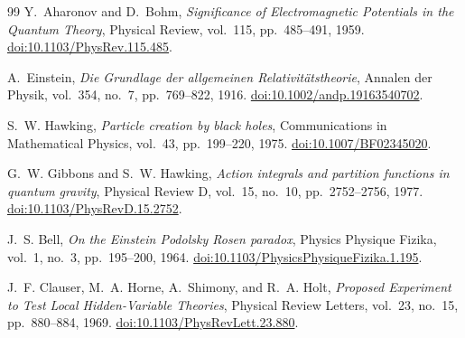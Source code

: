 \begin{thebibliography}{99}
Y.~Aharonov and D.~Bohm,
\emph{Significance of Electromagnetic Potentials in the Quantum Theory},
Physical Review, vol.~115, pp.~485--491, 1959.
\href{https://doi.org/10.1103/PhysRev.115.485}{doi:10.1103/PhysRev.115.485}.

A.~Einstein,
\emph{Die Grundlage der allgemeinen Relativit\"atstheorie},
Annalen der Physik, vol.~354, no.~7, pp.~769--822, 1916.
\href{https://doi.org/10.1002/andp.19163540702}{doi:10.1002/andp.19163540702}.

S.~W. Hawking,
\emph{Particle creation by black holes},
Communications in Mathematical Physics, vol.~43, pp.~199--220, 1975.
\href{https://doi.org/10.1007/BF02345020}{doi:10.1007/BF02345020}.

G.~W. Gibbons and S.~W. Hawking,
\emph{Action integrals and partition functions in quantum gravity},
Physical Review D, vol.~15, no.~10, pp.~2752--2756, 1977.
\href{https://doi.org/10.1103/PhysRevD.15.2752}{doi:10.1103/PhysRevD.15.2752}.

J.~S. Bell,
\emph{On the Einstein Podolsky Rosen paradox},
Physics Physique Fizika, vol.~1, no.~3, pp.~195--200, 1964.
\href{https://doi.org/10.1103/PhysicsPhysiqueFizika.1.195}{doi:10.1103/PhysicsPhysiqueFizika.1.195}.

J.~F. Clauser, M.~A. Horne, A.~Shimony, and R.~A. Holt,
\emph{Proposed Experiment to Test Local Hidden-Variable Theories},
Physical Review Letters, vol.~23, no.~15, pp.~880--884, 1969.
\href{https://doi.org/10.1103/PhysRevLett.23.880}{doi:10.1103/PhysRevLett.23.880}.

\end{thebibliography}
